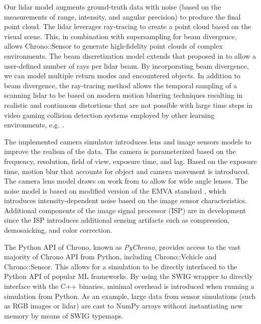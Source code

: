 Our lidar model augments ground-truth data with noise (based on the measurements of range, intensity, and angular precision) to produce the final point cloud. The lidar leverages ray-tracing to create a point cloud based on the visual scene. This, in combination with supersampling for beam divergence, allows Chrono::Sensor to generate high-fidelity point clouds of complex environments. The beam discretization model extends that proposed in \cite{goodin2018enabling} to allow a user-defined number of rays per lidar beam. By incorporating beam divergence, we can model multiple return modes and encountered objects. In addition to beam divergence, the ray-tracing method allows the temporal sampling of a scanning lidar to be based on modern motion blurring techniques resulting in realistic and continuous distortions that are not possible with large time steps in video gaming collision detection systems employed by other learning environments, e.g. \cite{shah2018airsim,carlaAVsim2017}.

The implemented camera simulator introduces lens and image sensors models to improve the realism of the data. The camera is parameterized based on the frequency, resolution, field of view, exposure time, and lag. Based on the exposure time, motion blur that accounts for object and camera movement is introduced. The camera lens model draws on work from \cite{tang2017precision} to allow for wide angle lenses. The noise model is based on modified version of the EMVA standard \cite{standard20101288}, which introduces intensity-dependent noise based on the image sensor characteristics. Additional components of the image signal processor (ISP) are in development since the ISP introduces additional sensing artifacts such as compression, demosaicking, and color correction.

The Python API of Chrono, known as \emph{PyChrono}, provides access to the vast majority of Chrono API from Python, including Chrono::Vehicle and Chrono::Sensor. This allows for a simulation to be directly interfaced to the Python API of popular ML frameworks. By using the SWIG wrapper \cite{Beazley96SWIG} to directly interface with the C++ binaries, minimal overhead is introduced when running a simulation from Python. As an example, large data from sensor simulations (such as RGB images or lidar) are cast to NumPy arrays without instantiating new memory by means of SWIG typemaps. 


